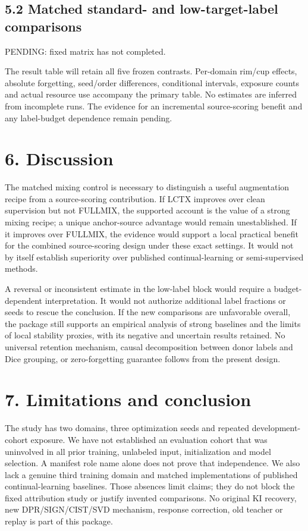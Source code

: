 \documentclass[
]{article}
\begin{document}
\subsection{5.2 Matched standard- and low-target-label
comparisons}\label{matched-standard--and-low-target-label-comparisons}

PENDING: fixed matrix has not completed.

The result table will retain all five frozen contrasts. Per-domain
rim/cup effects, absolute forgetting, seed/order differences,
conditional intervals, exposure counts and actual resource use accompany
the primary table. No estimates are inferred from incomplete runs. The
evidence for an incremental source-scoring benefit and any label-budget
dependence remain pending.

\section{6. Discussion}\label{discussion}

The matched mixing control is necessary to distinguish a useful
augmentation recipe from a source-scoring contribution. If LCTX improves
over clean supervision but not FULLMIX, the supported account is the
value of a strong mixing recipe; a unique anchor-source advantage would
remain unestablished. If it improves over FULLMIX, the evidence would
support a local practical benefit for the combined source-scoring design
under these exact settings. It would not by itself establish superiority
over published continual-learning or semi-supervised methods.

A reversal or inconsistent estimate in the low-label block would require
a budget-dependent interpretation. It would not authorize additional
label fractions or seeds to rescue the conclusion. If the new
comparisons are unfavorable overall, the package still supports an
empirical analysis of strong baselines and the limits of local stability
proxies, with its negative and uncertain results retained. No universal
retention mechanism, causal decomposition between donor labels and Dice
grouping, or zero-forgetting guarantee follows from the present design.

\section{7. Limitations and
conclusion}\label{limitations-and-conclusion}

The study has two domains, three optimization seeds and repeated
development-cohort exposure. We have not established an evaluation
cohort that was uninvolved in all prior training, unlabeled input,
initialization and model selection. A manifest role name alone does not
prove that independence. We also lack a genuine third training domain
and matched implementations of published continual-learning baselines.
Those absences limit claims; they do not block the fixed attribution
study or justify invented comparisons. No original KI recovery, new
DPR/SIGN/CIST/SVD mechanism, response correction, old teacher or replay
is part of this package.
\end{document}
